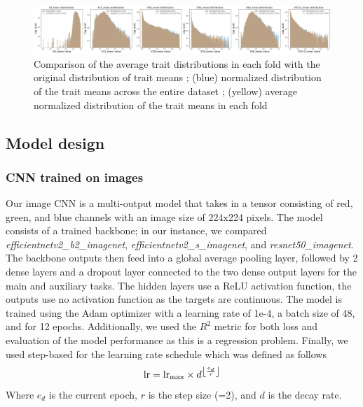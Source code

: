 \documentclass[12pt,a4paper,oneside]{article}
\begin{document}
\begin{figure}[!h]
    \centering
    \includegraphics[width=1\textwidth]{assets/distribution_match_folds.png}
    \caption{Comparison of the average trait distributions in each fold with the original distribution of trait means ; (blue) normalized distribution of the trait means across the entire dataset ; (yellow) average normalized distribution of the trait means in each fold}
\end{figure}

\subsection{Model design}

\subsubsection{CNN trained on images}

Our image CNN is a multi-output model that takes in a tensor consisting of red, green, and blue channels with an image size of 224x224 pixels. The model consists of a trained backbone; in our instance, we compared \textit{efficientnetv2\_b2\_imagenet}, \textit{efficientnetv2\_s\_imagenet}, and \textit{resnet50\_imagenet}. The backbone outputs then feed into a global average pooling layer, followed by 2 dense layers and a dropout layer connected to the two dense output layers for the main and auxiliary tasks. The hidden layers use a ReLU activation function, the outputs use no activation function as the targets are continuous. The model is trained using the Adam optimizer with a learning rate of 1e-4, a batch size of 48, and for 12 epochs. Additionally, we used the $R^2$ metric for both loss and evaluation of the model performance as this is a regression problem. Finally, we used step-based for the learning rate schedule which was defined as follows
\[
    \text{lr} = \text{lr}_\text{max} \times d^{\floor*{\frac{e_d}{r}}}
\]
Where $e_d$ is the current epoch, $r$ is the step size (=2), and $d$ is the decay rate.
\end{document}
